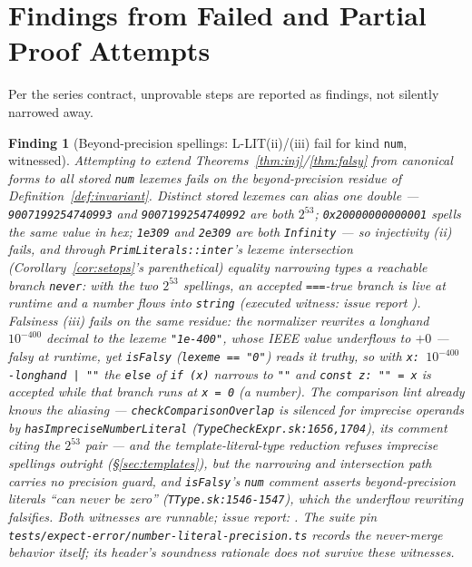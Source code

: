 \documentclass[11pt]{article}
\newtheorem{finding}[theorem]{Finding}
\begin{document}
\section{Findings from Failed and Partial Proof Attempts}
\label{sec:findings}

Per the series contract, unprovable steps are reported as findings, not
silently narrowed away.

\begin{finding}[Beyond-precision spellings: L-LIT(ii)/(iii) fail for
kind \texttt{num}, witnessed]
\label{find:precision}
Attempting to extend Theorems~\ref{thm:inj}/\ref{thm:falsy} from
canonical forms to \emph{all} stored \texttt{num} lexemes fails on the
beyond-precision residue of Definition~\ref{def:invariant}. Distinct
stored lexemes can alias one double --- \texttt{9007199254740993} and
\texttt{9007199254740992} are both $2^{53}$; \texttt{0x20000000000001}
spells the same value in hex; \texttt{1e309} and \texttt{2e309} are both
\texttt{Infinity} --- so injectivity (ii) fails, and through
\texttt{PrimLiterals::inter}'s lexeme intersection
(Corollary~\ref{cor:setops}'s parenthetical) equality narrowing types a
reachable branch \texttt{never}: with the two $2^{53}$ spellings, an
accepted \texttt{===}-true branch is live at runtime and a number flows
into \texttt{string} (executed witness: issue report
). Falsiness (iii)
fails on the same residue: the normalizer rewrites a longhand
$10^{-400}$ decimal to the lexeme \texttt{"1e-400"}, whose IEEE value
underflows to $+0$ --- falsy at runtime, yet \texttt{isFalsy}
(\texttt{lexeme == "0"}) reads it truthy, so with
\texttt{x:\ $10^{-400}$-longhand | ""} the \texttt{else} of
\texttt{if (x)} narrows to \texttt{""} and \texttt{const z:\ "" = x} is
accepted while that branch runs at \texttt{x = 0} (a number). The
comparison \emph{lint} already knows the aliasing ---
\texttt{checkComparisonOverlap} is silenced for imprecise operands by
\texttt{hasImpreciseNumberLiteral}
(\texttt{TypeCheckExpr.sk:1656,1704}), its comment citing the
$2^{53}$ pair --- and the template-literal-type reduction refuses
imprecise spellings outright (\S\ref{sec:templates}), but the narrowing
and intersection path carries no precision guard, and \texttt{isFalsy}'s
\texttt{num} comment asserts beyond-precision literals ``can never be
zero'' (\texttt{TType.sk:1546-1547}), which the underflow rewriting
falsifies. Both witnesses are runnable; issue report:
. The suite pin
\texttt{tests/expect-error/number-literal-precision.ts} records the
never-merge behavior itself; its header's soundness rationale does not
survive these witnesses.
\end{finding}
\end{document}
